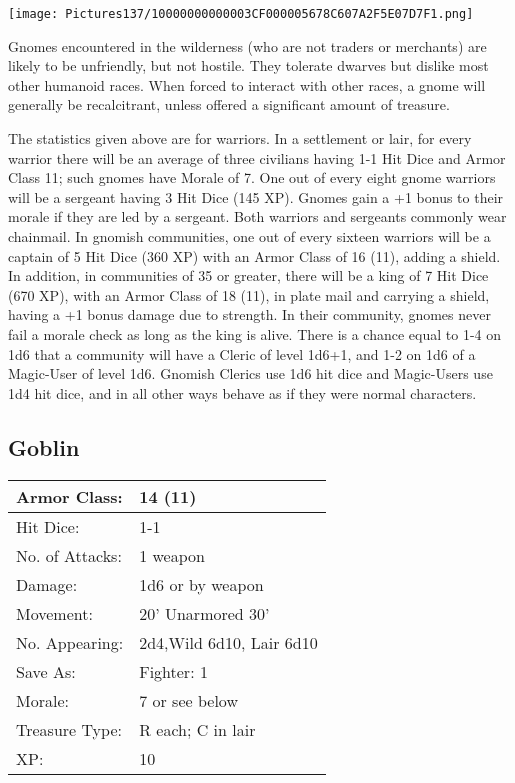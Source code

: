 \documentclass[a4paper,twoside,openany,10pt]{book}
\begin{document}
\begin{multicols}{2}
\begin{center}
	\texttt{[image: Pictures137/10000000000003CF000005678C607A2F5E07D7F1.png]}
\end{center}

Gnomes encountered in the wilderness (who are not traders or merchants) are likely to be unfriendly, but not hostile. They tolerate dwarves but dislike most other humanoid races. When forced to interact with other races, a gnome will generally be recalcitrant, unless offered a significant amount of treasure.

The statistics given above are for warriors. In a settlement or lair, for every warrior there will be an average of three civilians having 1-1 Hit Dice and Armor Class 11; such gnomes have Morale of 7. One out of every eight gnome warriors will be a sergeant having 3 Hit Dice (145 XP). Gnomes gain a +1 bonus to their morale if they are led by a sergeant. Both warriors and sergeants commonly wear chainmail. In gnomish communities, one out of every sixteen warriors will be a captain of 5 Hit Dice (360 XP) with an Armor Class of 16 (11), adding a shield. In addition, in communities of 35 or greater, there will be a king of 7 Hit Dice (670 XP), with an Armor Class of 18 (11), in plate mail and carrying a shield, having a +1 bonus damage due to strength. In their community, gnomes never fail a morale check as long as the king is alive. There is a chance equal to 1-4 on 1d6 that a community will have a Cleric of level 1d6+1, and 1-2 on 1d6 of a Magic-User of level 1d6. Gnomish Clerics use 1d6 hit dice and Magic-Users use 1d4 hit dice, and in all other ways behave as if they were normal characters.

\subsection*{Goblin}\label{goblin}

\begin{tabularx}{0.48\textwidth}{@{}lX@{}}
Armor Class: & 14 (11) \\\hline
Hit Dice: & 1-1 \\\hline
No. of Attacks: & 1 weapon \\\hline
Damage: & 1d6 or by weapon \\\hline
Movement: & 20' Unarmored 30' \\\hline
No. Appearing: & 2d4,Wild 6d10, Lair 6d10 \\\hline
Save As: & Fighter: 1 \\\hline
Morale: & 7 or see below \\\hline
Treasure Type: & R each; C in lair \\\hline
XP: & 10 \\\hline
\end{tabularx}\medskip



\end{multicols}
\end{document}

